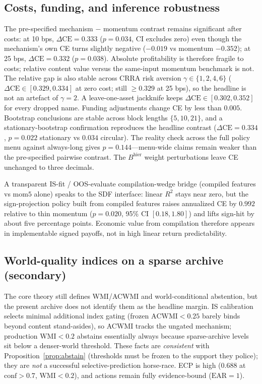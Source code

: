 \documentclass[12pt]{article}
\begin{document}
\subsection{Costs, funding, and inference robustness}
The pre-specified mechanism $-$ momentum contrast remains significant after costs: at 10 bps, $\Delta\mathrm{CE}=0.333$ ($p=0.034$, CI excludes zero) even though the mechanism's own CE turns slightly negative ($-0.019$ vs momentum $-0.352$); at 25 bps, $\Delta\mathrm{CE}=0.332$ ($p=0.038$). Absolute profitability is therefore fragile to costs; relative content value versus the same-input momentum benchmark is not. The relative gap is also stable across CRRA risk aversion $\gamma\in\{1,2,4,6\}$ ($\Delta\mathrm{CE}\in[0.329,0.334]$ at zero cost; still $\ge 0.329$ at 25 bps), so the headline is not an artefact of $\gamma=2$. A leave-one-asset jackknife keeps $\Delta\mathrm{CE}\in[0.302,0.352]$ for every dropped name. Funding adjustments change CE by less than $0.005$. Bootstrap conclusions are stable across block lengths $\{5,10,21\}$, and a \citet{politis1994} stationary-bootstrap confirmation reproduces the headline contrast ($\Delta\mathrm{CE}=0.334$, $p=0.022$ stationary vs $0.034$ circular). The \citet{white2000} reality check across the full policy menu against always-long gives $p=0.144$---menu-wide claims remain weaker than the pre-specified pairwise contrast. The $B^{\mathrm{hier}}$ weight perturbations leave CE unchanged to three decimals.

A transparent IS-fit / OOS-evaluate compilation-wedge bridge (compiled features vs $\mathrm{mom5}$ alone) speaks to the SDF interface: linear $R^2$ stays near zero, but the sign-projection policy built from compiled features raises annualized CE by $0.992$ relative to thin momentum ($p=0.020$, 95\% CI $[0.18,1.80]$) and lifts sign-hit by about five percentage points. Economic value from compilation therefore appears in implementable signed payoffs, not in high linear return predictability.

\subsection{World-quality indices on a sparse archive (secondary)}
The core theory still defines WMI/ACWMI and world-conditional abstention, but the present archive does not identify them as the headline margin. IS calibration selects minimal additional index gating (frozen $\mathrm{ACWMI}<0.25$ barely binds beyond content stand-asides), so ACWMI tracks the ungated mechanism; production WMI$<0.2$ abstains essentially always because sparse-archive levels sit below a denser-world threshold. These facts are \emph{consistent} with Proposition~\ref{prop:abstain} (thresholds must be frozen to the support they police); they are \emph{not} a successful selective-prediction horse-race. ECP is high ($0.688$ at $\mathrm{conf}>0.7$, $\mathrm{WMI}<0.2$), and actions remain fully evidence-bound ($\mathrm{EAR}=1$).
\end{document}

